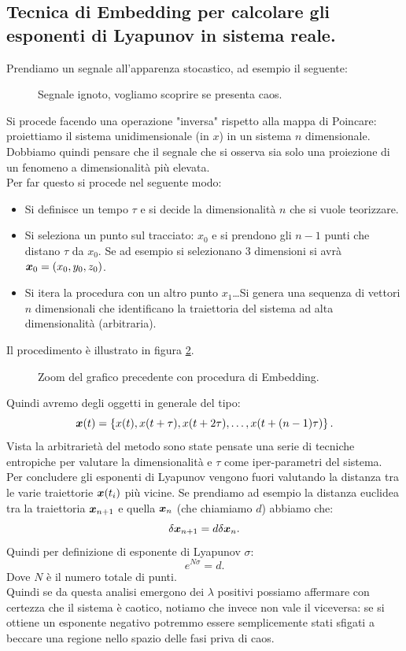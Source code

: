 \subsection{Tecnica di Embedding per calcolare gli esponenti di Lyapunov in sistema reale.}%
\label{sub:Tecnica di Embedding per calcolare gli esponenti di Lyapunov in sistema reale.}
Prendiamo un segnale all'apparenza stocastico, ad esempio il seguente:
\begin{figure}[H]
    \centering
    \caption{\scriptsize Segnale ignoto, vogliamo scoprire se presenta caos.}
    \label{fig:21_caos_signal}
\end{figure}
\noindent
Si procede facendo una operazione "inversa" rispetto alla mappa di Poincare: proiettiamo il sistema unidimensionale (in $x$) in un sistema $n$ dimensionale. \\
Dobbiamo quindi pensare che il segnale che si osserva sia solo una proiezione di un fenomeno a dimensionalità più elevata.\\
Per far questo si procede nel seguente modo:
\begin{itemize}
    \item Si definisce un tempo $\tau$ e si decide la dimensionalità $n$ che si vuole teorizzare.
    \item Si seleziona un punto sul tracciato: $x_0$ e si prendono gli $n-1$ punti che distano $\tau$ da $x_0$. Se ad esempio si selezionano 3 dimensioni si avrà $\boldsymbol{x}_0 = (x_0, y_0, z_0)$.
    \item Si itera la procedura con un altro punto $x_1$\ldots Si genera una sequenza di vettori $n$ dimensionali che identificano la traiettoria del sistema ad alta dimensionalità (arbitraria).
\end{itemize}
Il procedimento è illustrato in figura \ref{fig:21_embed}.
\begin{figure}[H]
    \centering
    \caption{\scriptsize Zoom del grafico precedente con procedura di Embedding.}
    \label{fig:21_embed}
\end{figure}
\noindent
Quindi avremo degli oggetti in generale del tipo:
\[
    \boldsymbol{x} (t)= \left\{x(t), x(t+\tau), x(t+2\tau), \ldots, x(t+(n-1)\tau) \right\}
.\] 
Vista la arbitrarietà del metodo sono state pensate una serie di tecniche entropiche per valutare la dimensionalità e $\tau$ come iper-parametri del sistema.\\
Per concludere gli esponenti di Lyapunov vengono fuori valutando la distanza tra le varie traiettorie $\boldsymbol{x} (t_i)$ più vicine. Se prendiamo ad esempio la distanza euclidea tra la traiettoria $\boldsymbol{x}_{n+1}$ e quella $\boldsymbol{x}_n$ (che chiamiamo $d$) abbiamo che:
\[
    \delta\boldsymbol{x}_{n+1} = d \delta\boldsymbol{x}_n
.\] 
Quindi per definizione di esponente di Lyapunov $\sigma$:
\[
    e^{N\sigma} = d
.\] 
Dove $N$ è il numero totale di punti.\\
Quindi se da questa analisi emergono dei $\lambda$ positivi possiamo affermare con certezza che il sistema è caotico, notiamo che invece non vale il viceversa: se si ottiene un esponente negativo potremmo essere semplicemente stati sfigati a beccare una regione nello spazio delle fasi priva di caos.
